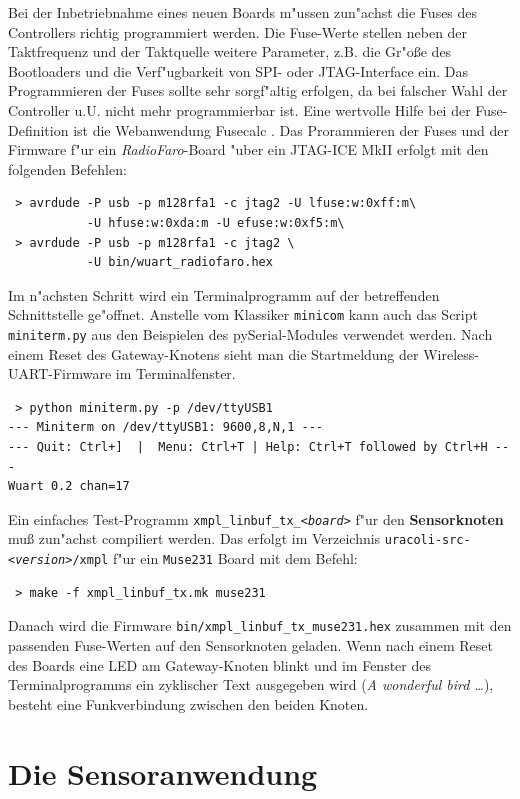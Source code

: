 \documentclass{clt2011}
\begin{document}
Bei der Inbetriebnahme eines neuen Boards m"ussen zun"achst die Fuses des Controllers
richtig programmiert werden. Die Fuse-Werte stellen neben der Taktfrequenz und der
Taktquelle weitere Parameter, z.B. die Gr"o\ss{}e des Bootloaders und die Verf"ugbarkeit
von SPI- oder JTAG-Interface ein. Das Programmieren der Fuses sollte sehr sorgf"altig
erfolgen, da bei falscher Wahl der Controller u.U. nicht mehr programmierbar ist. Eine
wertvolle Hilfe bei der Fuse-Definition ist die Webanwendung Fusecalc \cite{fusecalc}.
Das Prorammieren der Fuses und der Firmware f"ur ein {\em RadioFaro}-Board "uber ein JTAG-ICE MkII
erfolgt mit den folgenden Befehlen:
\begin{lstlisting}
 > avrdude -P usb -p m128rfa1 -c jtag2 -U lfuse:w:0xff:m\
           -U hfuse:w:0xda:m -U efuse:w:0xf5:m\
 > avrdude -P usb -p m128rfa1 -c jtag2 \
           -U bin/wuart_radiofaro.hex
\end{lstlisting}

Im n"achsten Schritt wird ein Terminalprogramm auf der betreffenden Schnittstelle
ge"offnet. Anstelle vom Klassiker {\tt minicom} kann auch das Script
{\tt miniterm.py} \cite{miniterm} aus den Beispielen des pySerial-Modules verwendet werden.
Nach einem Reset des Gateway-Knotens sieht man die Startmeldung der Wireless-UART-Firmware im
Terminalfenster.
\begin{lstlisting}
 > python miniterm.py -p /dev/ttyUSB1
--- Miniterm on /dev/ttyUSB1: 9600,8,N,1 ---
--- Quit: Ctrl+]  |  Menu: Ctrl+T | Help: Ctrl+T followed by Ctrl+H ---
Wuart 0.2 chan=17
\end{lstlisting}

Ein einfaches Test-Programm {\tt xmpl\_linbuf\_tx\_{\em<board>}} f"ur den {\bf Sensorknoten} mu\ss{}
zun"achst compiliert werden. Das erfolgt
im Verzeichnis {\tt uracoli-src-{\em<version>}/xmpl} f"ur ein {\tt Muse231} Board
mit dem Befehl:
\begin{lstlisting}
 > make -f xmpl_linbuf_tx.mk muse231
\end{lstlisting}

Danach wird die Firmware {\tt bin/xmpl\_linbuf\_tx\_muse231.hex} zusammen
mit den passenden Fuse-Werten auf den Sensorknoten geladen.
Wenn nach einem Reset des Boards eine LED am Gateway-Knoten blinkt und im
Fenster des Terminalprogramms ein zyklischer Text ausgegeben wird
({\em A wonderful bird \dots}), besteht eine Funkverbindung zwischen den beiden
Knoten.

\section{Die Sensoranwendung}
\end{document}
